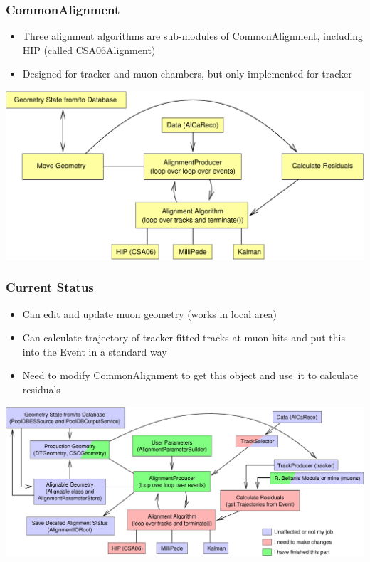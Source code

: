 \documentclass[compress]{beamer}
\begin{document}
\begin{frame}
\frametitle{CommonAlignment}

\begin{itemize}
\item Three alignment algorithms are sub-modules of CommonAlignment,
including HIP (called CSA06Alignment)
\item Designed for tracker and muon chambers, but only implemented for
tracker
\end{itemize}

\begin{center}
\includegraphics[width=\linewidth]{flow_chart_simplified}
\end{center}
\end{frame}

\begin{frame}
\frametitle{Current Status}

\begin{itemize}
\item Can edit and update muon geometry (works in local area)
\item Can calculate trajectory of tracker-fitted tracks at muon hits
and put this into the Event in a standard way
\item Need to modify CommonAlignment to get this object and \mbox{use it} to
calculate residuals
\end{itemize}

\begin{center}
\includegraphics[width=\linewidth]{flow_chart}
\end{center}
\end{frame}
\end{document}
